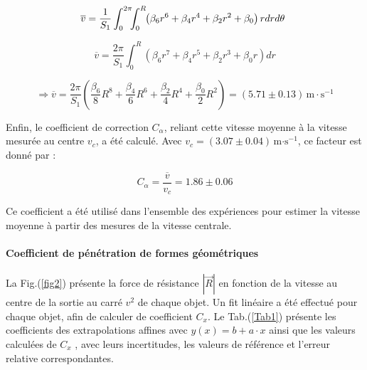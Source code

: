 \documentclass[a4paper, 12pt,oneside]{article}
\begin{document}
\vspace{-0.5cm}

\[
\hspace{-0.15cm} \overline{v} = \frac{1}{S_1} \int_0^{2\pi} \hspace{-0.15cm}\int_0^R \hspace{-0.1cm} \left( \beta_6 r^6 + \beta_4 r^4 + \beta_2 r^2 + \beta_0 \right) rdrd\theta
\]

\vspace{-0.2cm}

\[
\overline{v} = \frac{2\pi}{S_1} \int_0^R \left( \beta_6 r^7 + \beta_4 r^5 + \beta_2 r^3 + \beta_0 r \right) dr
\]

\vspace{-0.2cm}

\[
\Rightarrow \overline{v} = \frac{2\pi}{S_1} \left( \frac{\beta_6}{8} R^8 + \frac{\beta_4}{6} R^6 + \frac{\beta_2}{4} R^4 + \frac{\beta_0}{2} R^2 \right) = (5.71\pm0.13)\,\text{m}\cdot\text{s}^{-1}
\]

Enfin, le coefficient de correction $C_\alpha$, reliant cette vitesse moyenne à la vitesse mesurée au centre $v_c$, a été calculé. Avec $v_c = ( 3.07 \pm 0.04) \, \text{m·s}^{-1}$, ce facteur est donné par :

\vspace{-0.25cm}
\[
C_\alpha = \frac{\overline{v}}{v_c} = 1.86 \pm 0.06
\] 
\vspace{-0.35cm}

Ce coefficient a été utilisé dans l’ensemble des expériences pour estimer la vitesse moyenne à partir des mesures de la vitesse centrale.

\vspace{-0.6cm}
\paragraph{Coefficient de pénétration de formes géométriques} 

La Fig.(\ref{fig2}) présente la force de résistance $|\vec{R}|$ en fonction de la vitesse au centre de la sortie au carré $v^2$ de chaque objet. Un fit linéaire a été effectué pour chaque objet, afin de calculer de coefficient $C_x$. Le Tab.(\ref{Tab1}) présente les coefficients des extrapolations affines avec $y(x)=b+a \cdot x$ ainsi que les valeurs calculées de $C_x$ , avec leurs incertitudes, les valeurs de référence et l'erreur relative correspondantes.
\vspace{-0.35cm}
\end{document}
